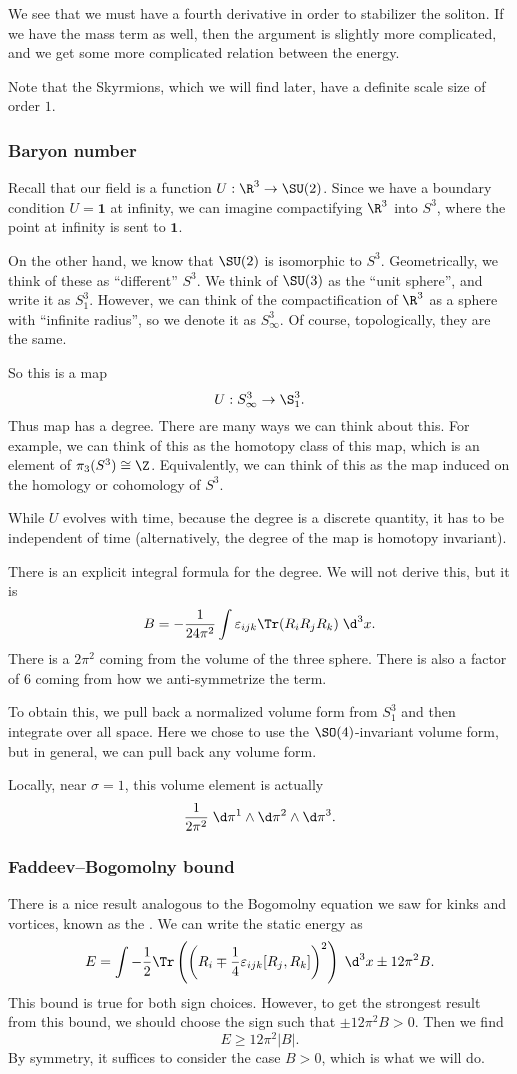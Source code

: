 \documentclass[a4paper]{article}
\begin{document}
We see that we must have a fourth derivative in order to stabilizer the soliton. If we have the mass term as well, then the argument is slightly more complicated, and we get some more complicated relation between the energy.

Note that the Skyrmions, which we will find later, have a definite scale size of order $1$.

\subsubsection*{Baryon number}
Recall that our field is a function $U: \R^3 \to \SU(2)$. Since we have a boundary condition $U = \mathbf{1}$ at infinity, we can imagine compactifying $\R^3$ into $S^3$, where the point at infinity is sent to $\mathbf{1}$.

On the other hand, we know that $\SU(2)$ is isomorphic to $S^3$. Geometrically, we think of these as ``different'' $S^3$. We think of $\SU(3)$ as the ``unit sphere'', and write it as $S^3_1$. However, we can think of the compactification of $\R^3$ as a sphere with ``infinite radius'', so we denote it as $S^3_\infty$. Of course, topologically, they are the same.

So this is a map
\[
  U: S^3_\infty \to \S^3_1.
\]
Thus map has a degree. There are many ways we can think about this. For example, we can think of this as the homotopy class of this map, which is an element of $\pi_3(S^3) \cong \Z$. Equivalently, we can think of this as the map induced on the homology or cohomology of $S^3$.

While $U$ evolves with time, because the degree is a discrete quantity, it has to be independent of time (alternatively, the degree of the map is homotopy invariant).

There is an explicit integral formula for the degree. We will not derive this, but it is
\[
  B = - \frac{1}{24\pi^2} \int \varepsilon_{ijk} \Tr(R_i R_j R_k) \;\d^3 x.
\]
There is a $2\pi^2$ coming from the volume of the three sphere. There is also a factor of $6$ coming from how we anti-symmetrize the term.

To obtain this, we pull back a normalized volume form from $S_1^3$ and then integrate over all space. Here we chose to use the $\SO(4)$-invariant volume form, but in general, we can pull back any volume form.

Locally, near $\sigma = 1$, this volume element is actually
\[
  \frac{1}{2\pi^2}\;\d \pi^1 \wedge\d \pi^2 \wedge\d \pi^3.
\]
\subsubsection*{Faddeev--Bogomolny bound}
There is a nice result analogous to the Bogomolny equation we saw for kinks and vortices, known as the . We can write the static energy as
\[
  E = \int - \frac{1}{2} \Tr\left(\left(R_i \mp \frac{1}{4} \varepsilon_{ijk}[R_j, R_k]\right)^2\right)\;\d^3 x \pm 12 \pi^2 B.
\]
This bound is true for both sign choices. However, to get the strongest result from this bound, we should choose the sign such that $\pm 12 \pi^2 B > 0$. Then we find
\[
  E \geq 12 \pi^2 |B|.
\]
By symmetry, it suffices to consider the case $B > 0$, which is what we will do.
\end{document}
